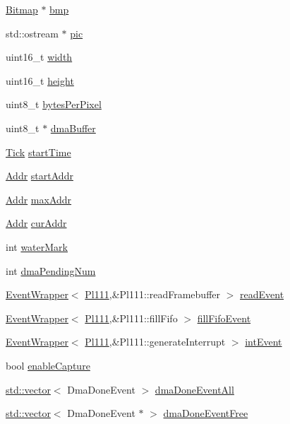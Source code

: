 \begin{DoxyCompactItemize}
\hyperlink{classBitmap}{Bitmap} $\ast$ \hyperlink{classPl111_ada429bf89af3356a338f9532d68623cc}{bmp}
\item 
std::ostream $\ast$ \hyperlink{classPl111_af724472dcdfb49ce72ef865c101a1c0d}{pic}
\item 
uint16\_\-t \hyperlink{classPl111_ad0eab1042455a2067c812ab8071d5376}{width}
\item 
uint16\_\-t \hyperlink{classPl111_a81c9f8d0b8c3b49d770be14dbe9f0d37}{height}
\item 
uint8\_\-t \hyperlink{classPl111_a2c6362e11e7da8346152a55d2c1578a6}{bytesPerPixel}
\item 
uint8\_\-t $\ast$ \hyperlink{classPl111_a4ad3773f36449f12f8667bf12237f5a1}{dmaBuffer}
\item 
\hyperlink{base_2types_8hh_a5c8ed81b7d238c9083e1037ba6d61643}{Tick} \hyperlink{classPl111_ab5743263961f5e71b5c28986b8b3dfbe}{startTime}
\item 
\hyperlink{base_2types_8hh_af1bb03d6a4ee096394a6749f0a169232}{Addr} \hyperlink{classPl111_aee7739bdc9884d0ee837a99b832cf0d1}{startAddr}
\item 
\hyperlink{base_2types_8hh_af1bb03d6a4ee096394a6749f0a169232}{Addr} \hyperlink{classPl111_a1e2e5337e1ab8b10d44ef50de51e14ce}{maxAddr}
\item 
\hyperlink{base_2types_8hh_af1bb03d6a4ee096394a6749f0a169232}{Addr} \hyperlink{classPl111_a791de8c75b67169bea9c7e9b56a294f7}{curAddr}
\item 
int \hyperlink{classPl111_a9741d287c1526a377487fb3a078a17dd}{waterMark}
\item 
int \hyperlink{classPl111_a51a10d47f66c47e4701a3d9a7193eef1}{dmaPendingNum}
\item 
\hyperlink{classEventWrapper}{EventWrapper}$<$ \hyperlink{classPl111}{Pl111},\&Pl111::readFramebuffer $>$ \hyperlink{classPl111_a48f76313a745a16ffbdc95fbc4dfebf2}{readEvent}
\item 
\hyperlink{classEventWrapper}{EventWrapper}$<$ \hyperlink{classPl111}{Pl111},\&Pl111::fillFifo $>$ \hyperlink{classPl111_ae4caf4c339850803aeea275f13b63c39}{fillFifoEvent}
\item 
\hyperlink{classEventWrapper}{EventWrapper}$<$ \hyperlink{classPl111}{Pl111},\&Pl111::generateInterrupt $>$ \hyperlink{classPl111_a091cc936e2951ae8884e7a54b184811c}{intEvent}
\item 
bool \hyperlink{classPl111_abf8ed1a0152ea70d689ffce800cd32fd}{enableCapture}
\end{DoxyCompactItemize}
\begin{Indent}{\bf }\par
{\em \label{_amgrpd41d8cd98f00b204e9800998ecf8427e}
 }\begin{DoxyCompactItemize}
\item 
\hyperlink{classstd_1_1vector}{std::vector}$<$ DmaDoneEvent $>$ \hyperlink{classPl111_aa50a0179a2d530a0a45d74b014c425fe}{dmaDoneEventAll}
\item 
\hyperlink{classstd_1_1vector}{std::vector}$<$ DmaDoneEvent $\ast$ $>$ \hyperlink{classPl111_ada9c1832b166debd201f034b2fcb4ab2}{dmaDoneEventFree}
\end{DoxyCompactItemize}
\end{Indent}
